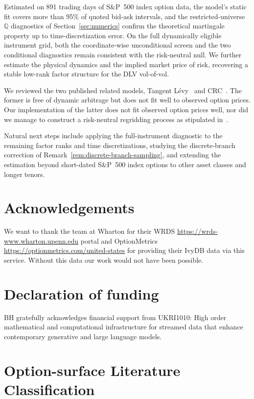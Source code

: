 \documentclass[11pt]{article}
\newcommand{\Q}{\mathbb Q}
\theoremstyle{plain}
\theoremstyle{definition}
\theoremstyle{remark}
\begin{document}
Estimated on 891 trading days of S\&P~500 index option data, the model's static fit covers more
than 95\% of quoted bid-ask intervals, and the restricted-universe $\Q$ diagnostics of
Section~\ref{sec:numerics} confirm the theoretical martingale property up to time-discretization
error.  On the full dynamically eligible instrument grid, both the
coordinate-wise unconditional screen and the two conditional
diagnostics remain consistent with the risk-neutral null.
We further estimate the physical dynamics and the implied market price of risk, recovering a
stable low-rank factor structure for the DLV vol-of-vol.

We reviewed the two published related models, Tangent L\'evy~\citep{TangentLevy} and CRC~\citep{DysLitGambaraTeichmann2021}. The former is free of dynamic arbitrage
but does not fit well to observed option prices. Our implementation of the latter does not fit observed option prices
well, nor did we manage to construct a risk-neutral regridding process as stipulated in~\cite{DysLitGambaraTeichmann2021}.

Natural next steps include applying the full-instrument diagnostic to the
remaining factor ranks and time discretizations, studying the discrete-branch
correction of Remark~\ref{rem:discrete-branch-sampling}, and extending
the estimation beyond short-dated S\&P~500 index options to other asset classes and longer
tenors.

\section*{Acknowledgements}

We want to thank the team at Wharton for their WRDS \url{https://wrds-www.wharton.upenn.edu} portal and OptionMetrics \url{https://optionmetrics.com/united-states} 
for providing their IvyDB data via this service. Without this data our work would not have been possible.

\section*{Declaration of funding}
BH gratefully acknowledges financial support from UKRI1010: High order mathematical and computational infrastructure for streamed data that enhance contemporary generative and large language models.



\appendix




\clearpage
\section{Option-surface Literature Classification}
\label{app:literature-classification}
\def\GROMMpaper{}%




\end{document}
